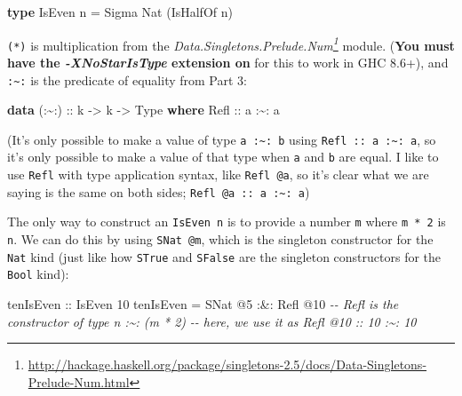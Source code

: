 \documentclass[]{article}
\newenvironment{Shaded}{}{}
\newcommand{\CommentTok}[1]{\textcolor[rgb]{0.38,0.63,0.69}{\textit{#1}}}
\newcommand{\DataTypeTok}[1]{\textcolor[rgb]{0.56,0.13,0.00}{#1}}
\newcommand{\DecValTok}[1]{\textcolor[rgb]{0.25,0.63,0.44}{#1}}
\newcommand{\KeywordTok}[1]{\textcolor[rgb]{0.00,0.44,0.13}{\textbf{#1}}}
\newcommand{\NormalTok}[1]{#1}
\newcommand{\OperatorTok}[1]{\textcolor[rgb]{0.40,0.40,0.40}{#1}}
\newcommand{\OtherTok}[1]{\textcolor[rgb]{0.00,0.44,0.13}{#1}}
\renewcommand{\href}[2]{#2\footnote{\url{#1}}}
\begin{document}
\begin{enumerate}
\begin{Shaded}
\begin{Highlighting}[]
\KeywordTok{type} \DataTypeTok{IsEven}\NormalTok{ n }\OtherTok{=} \DataTypeTok{Sigma} \DataTypeTok{Nat}\NormalTok{ (}\DataTypeTok{IsHalfOf}\NormalTok{ n)}
\end{Highlighting}
\end{Shaded}

  \texttt{(*)} is multiplication from the
  \emph{\href{http://hackage.haskell.org/package/singletons-2.5/docs/Data-Singletons-Prelude-Num.html}{Data.Singletons.Prelude.Num}}
  module. (\textbf{You must have the \emph{-XNoStarIsType} extension on} for
  this to work in GHC 8.6+), and \texttt{:\textasciitilde{}:} is the predicate
  of equality from Part 3:

\begin{Shaded}
\begin{Highlighting}[]
\KeywordTok{data}\OtherTok{ (:\textasciitilde{}:) ::}\NormalTok{ k }\OtherTok{{-}>}\NormalTok{ k }\OtherTok{{-}>} \DataTypeTok{Type} \KeywordTok{where}
    \DataTypeTok{Refl}\OtherTok{ ::}\NormalTok{ a }\OperatorTok{:\textasciitilde{}:}\NormalTok{ a}
\end{Highlighting}
\end{Shaded}

  (It's only possible to make a value of type \texttt{a\ :\textasciitilde{}:\ b}
  using \texttt{Refl\ ::\ a\ :\textasciitilde{}:\ a}, so it's only possible to
  make a value of that type when \texttt{a} and \texttt{b} are equal. I like to
  use \texttt{Refl} with type application syntax, like \texttt{Refl\ @a}, so
  it's clear what we are saying is the same on both sides;
  \texttt{Refl\ @a\ ::\ a\ :\textasciitilde{}:\ a})

  The only way to construct an \texttt{IsEven\ n} is to provide a number
  \texttt{m} where \texttt{m\ *\ 2} is \texttt{n}. We can do this by using
  \texttt{SNat\ @m}, which is the singleton constructor for the \texttt{Nat}
  kind (just like how \texttt{STrue} and \texttt{SFalse} are the singleton
  constructors for the \texttt{Bool} kind):

\begin{Shaded}
\begin{Highlighting}[]
\OtherTok{tenIsEven ::} \DataTypeTok{IsEven} \DecValTok{10}
\NormalTok{tenIsEven }\OtherTok{=} \DataTypeTok{SNat} \OperatorTok{@}\DecValTok{5} \OperatorTok{:\&:} \DataTypeTok{Refl} \OperatorTok{@}\DecValTok{10}
    \CommentTok{{-}{-} Refl is the constructor of type n :\textasciitilde{}: (m * 2)}
    \CommentTok{{-}{-} here, we use it as Refl @10 :: 10 :\textasciitilde{}: 10}


\end{Highlighting}
\end{Shaded}
\end{enumerate}
\end{document}
